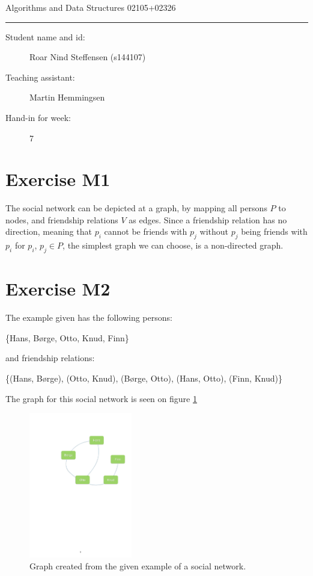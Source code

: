 \documentclass[10pt]{article}
\begin{document}
\begin{center}
{{\Large \sc Algorithms and Data Structures 02105+02326}}
\end{center}
\rule{\textwidth}{1pt}
\begin{description}
\item[Student name and id:] Roar Nind Steffensen (s144107)
\item[Teaching assistant:] Martin Hemmingsen
\item[Hand-in for week:] 7
\end{description}

\section*{Exercise M1}
The social network can be depicted at a graph, by mapping all persons $P$ to nodes, and friendship relations $V$ as edges. Since a friendship relation has no direction, meaning that $p_i$ cannot be friends with $p_j$ without $p_j$ being friends with $p_i$ for $p_i$, $p_j \in P$, the simplest graph we can choose, is a non-directed graph. 

\section*{Exercise M2}

The example given has the following persons:
\begin{center}
\{Hans, Børge, Otto, Knud, Finn\}
\end{center}
and friendship relations: 
\begin{center}
\{(Hans, Børge), (Otto, Knud), (Børge, Otto), (Hans, Otto), (Finn, Knud)\}
\end{center}


The graph for this social network is seen on figure \ref{fig:example}

\begin{figure}[H]
    \centering
    \includegraphics[width=0.4\textwidth]{example}
    \caption{Graph created from the given example of a social network.}
    \label{fig:example}
\end{figure}
\end{document}
